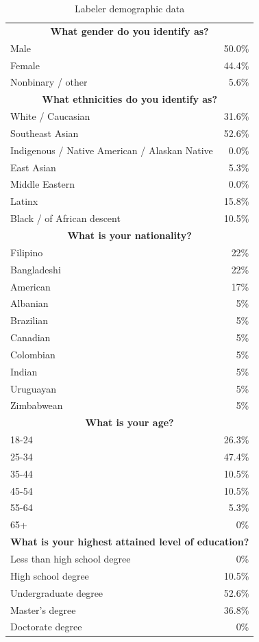 \begin{table}[]
    \centering
    \caption{Labeler demographic data}
    \label{tab:labeler_demographics}
    \begin{tabular}{l r}
    \toprule 
        \multicolumn{2}{c}{\textbf{What gender do you identify as?}}\\
         Male & 50.0\% \\
         Female & 44.4\% \\
         Nonbinary / other & 5.6\% \\ \midrule
         \multicolumn{2}{c}{\textbf{What ethnicities do you identify as?}}\\
         White / Caucasian & 31.6\% \\
         Southeast Asian & 52.6\% \\
         Indigenous / Native American / Alaskan Native  & 0.0\% \\
         East Asian & 5.3\% \\
         Middle Eastern & 0.0\% \\
         Latinx & 15.8\% \\
         Black / of African descent & 10.5\% \\ \midrule 
         \multicolumn{2}{c}{\textbf{What is your nationality?}}\\
         Filipino & 22\% \\
         Bangladeshi & 22\% \\
         American & 17\% \\
         Albanian & 5\% \\
         Brazilian & 5\% \\
         Canadian & 5\% \\
         Colombian & 5\% \\
         Indian & 5\% \\
         Uruguayan & 5\% \\
         Zimbabwean  & 5\% \\ \midrule
         \multicolumn{2}{c}{\textbf{What is your age?}}\\
         18-24 & 26.3\% \\
         25-34 & 47.4\% \\
         35-44 & 10.5\% \\
         45-54 & 10.5\% \\
         55-64 & 5.3\% \\
         65+ & 0\% \\ \midrule
         \multicolumn{2}{c}{\textbf{What is your highest attained level of education?}}\\
         Less than high school degree & 0\% \\
         High school degree & 10.5\% \\
         Undergraduate degree & 52.6\% \\
         Master's degree & 36.8\% \\
         Doctorate degree & 0\% \\
         \bottomrule
    \end{tabular}
\end{table}

